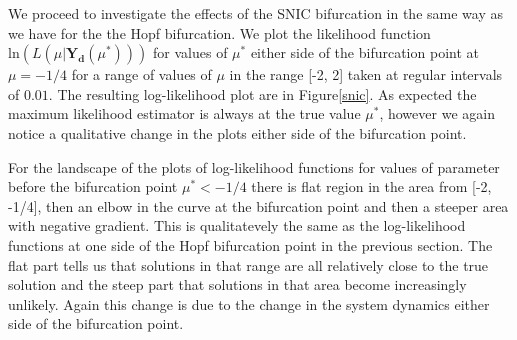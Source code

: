 \documentclass[12pt,a4paper,titlepage]{article}
\begin{document}
We proceed to investigate the effects of the SNIC bifurcation in the same way as we have for the the Hopf bifurcation. We plot the likelihood function $\text{ln}(L(\mu | \mathbf{Y_{d}}(\mu^*)))$ for values of $\mu^*$ either side of the bifurcation point at $\mu = -1/4$ for a range of values of $\mu$ in the range [-2, 2] taken at regular intervals of $0.01$. The resulting log-likelihood plot are in Figure\ref{snic}. As expected the maximum likelihood estimator is always at the true value $\mu^*$, however we again notice a qualitative change in the plots either side of the bifurcation point.

For the landscape of the plots of log-likelihood functions for values of parameter before the bifurcation point $\mu^* < -1/4$ there is flat region in the area from [-2, -1/4], then an elbow in the curve at the bifurcation point and then a steeper area with negative gradient. This is qualitatevely the same as the log-likelihood functions at one side of the Hopf bifurcation point in the previous section. The flat part tells us that solutions in that range are all relatively close to the true solution and the steep part that solutions in that area become increasingly unlikely. Again this change is due to the change in the system dynamics either side of the bifurcation point.
\end{document}
